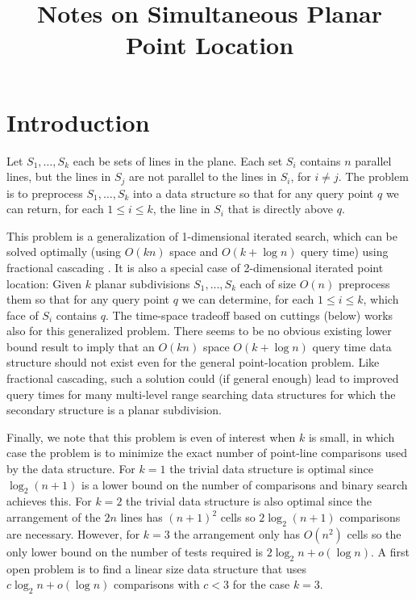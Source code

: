 \documentclass{article}
\title{Notes on Simultaneous Planar Point Location}
\begin{document}
\maketitle

\section{Introduction}

Let $S_1,\ldots,S_k$ each be sets of lines in the plane.  Each set
$S_i$ contains $n$ parallel lines, but the lines in $S_j$ are not
parallel to the lines in $S_i$, for $i\neq j$.  The problem is to
preprocess $S_1,\ldots,S_k$ into a data structure so that for any
query point $q$ we can return, for each $1\le i\le k$, the line in
$S_i$ that is directly above $q$. 

This problem is a generalization of 1-dimensional iterated search,
which can be solved optimally (using $O(kn)$ space and $O(k+\log n)$
query time) using fractional cascading \cite{cg86}.  It is also a
special case of 2-dimensional iterated point location: Given $k$
planar subdivisions $S_1,\ldots,S_k$ each of size $O(n)$ preprocess
them so that for any query point $q$ we can determine, for each $1\le
i\le k$, which face of $S_i$ contains $q$. The time-space tradeoff
based on cuttings (below) works also for this generalized problem.
There seems to be no obvious existing lower bound result to imply that
an $O(kn)$ space $O(k+\log n)$ query time data structure should not
exist even for the general point-location problem.  Like fractional
cascading, such a solution could (if general enough) lead to improved
query times for many multi-level range searching data structures for
which the secondary structure is a planar subdivision.

Finally, we note that this problem is even of interest when $k$ is
small, in which case the problem is to minimize the exact number of
point-line comparisons used by the data structure.  For $k=1$ the
trivial data structure is optimal since $\log_2 (n+1)$ is a lower
bound on the number of comparisons and binary search achieves this.
For $k=2$ the trivial data structure is also optimal since the
arrangement of the $2n$ lines has $(n+1)^2$ cells so $2\log_2 (n+1)$
comparisons are necessary.  However, for $k=3$ the arrangement only
has $O(n^2)$ cells so the only lower bound on the number of tests
required is $2\log_2 n + o(\log n)$.  A first open problem is to find
a linear size data structure that uses $c\log_2 n + o(\log n)$
comparisons with $c<3$ for the case $k=3$. 
\end{document}
